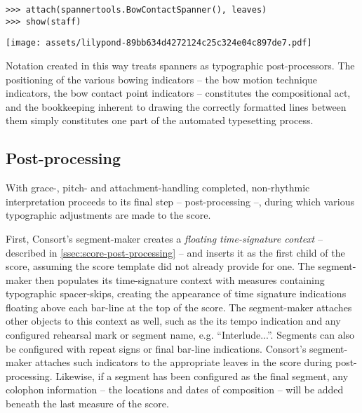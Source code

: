 \begin{comment}
<abjad>
attach(spannertools.BowContactSpanner(), leaves)
show(staff)
</abjad>
\end{comment}

\begin{abjadbookoutput}
\begin{singlespacing}
\vspace{-0.5\baselineskip}
\begin{lstlisting}
>>> attach(spannertools.BowContactSpanner(), leaves)
>>> show(staff)
\end{lstlisting}
\noindent\texttt{[image: assets/lilypond-89bb634d4272124c25c324e04c897de7.pdf]}
\end{singlespacing}
\end{abjadbookoutput}

\noindent Notation created in this way treats spanners as typographic
post-processors. The positioning of the various bowing indicators -- the bow
motion technique indicators, the bow contact point indicators -- constitutes
the compositional act, and the bookkeeping inherent to drawing the correctly
formatted lines between them simply constitutes one part of the automated
typesetting process.

\subsection{Post-processing}
\label{ssec:post-processing}

With grace-, pitch- and attachment-handling completed, non-rhythmic
interpretation proceeds to its final step -- post-processing --, during which
various typographic adjustments are made to the score.

First, Consort's segment-maker creates a \emph{floating time-signature context}
-- described in \autoref{ssec:score-post-processing} -- and inserts it as the
first child of the score, assuming the score template did not already provide
for one. The segment-maker then populates its time-signature context with
measures containing typographic spacer-skips, creating the appearance of time
signature indications floating above each bar-line at the top of the score. The
segment-maker attaches other objects to this context as well, such as the its
tempo indication and any configured rehearsal mark or segment name, e.g.
\enquote{Interlude...}. Segments can also be configured with repeat signs or
final bar-line indications. Consort's segment-maker attaches such indicators to
the appropriate leaves in the score during post-processing. Likewise, if a
segment has been configured as the final segment, any colophon information --
the locations and dates of composition -- will be added beneath the last
measure of the score.

